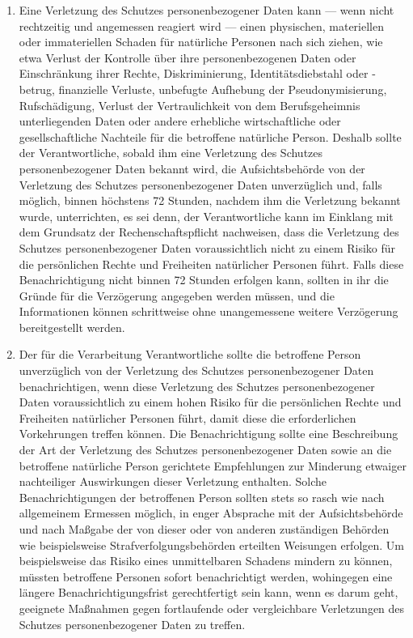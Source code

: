 \begin{enumerate}
   \item Eine Verletzung des Schutzes personenbezogener Daten kann — wenn nicht rechtzeitig und angemessen reagiert
    wird — einen physischen, materiellen oder immateriellen Schaden für natürliche Personen nach sich ziehen, wie etwa
    Verlust der Kontrolle über ihre personenbezogenen Daten oder Einschränkung ihrer Rechte, Diskriminierung,
    Identitätsdiebstahl oder -betrug, finanzielle Verluste, unbefugte Aufhebung der Pseudonymisierung, Rufschädigung,
    Verlust der Vertraulichkeit von dem Berufsgeheimnis unterliegenden Daten oder andere erhebliche wirtschaftliche
    oder gesellschaftliche Nachteile für die betroffene natürliche Person. Deshalb sollte der Verantwortliche, sobald
    ihm eine Verletzung des Schutzes personenbezogener Daten bekannt wird, die Aufsichtsbehörde von der Verletzung des
    Schutzes personenbezogener Daten unverzüglich und, falls möglich, binnen höchstens 72 Stunden, nachdem ihm die
    Verletzung bekannt wurde, unterrichten, es sei denn, der Verantwortliche kann im Einklang mit dem Grundsatz der
    Rechenschaftspflicht nachweisen, dass die Verletzung des Schutzes personenbezogener Daten voraussichtlich nicht zu
    einem Risiko für die persönlichen Rechte und Freiheiten natürlicher Personen führt. Falls diese Benachrichtigung
    nicht binnen 72 Stunden erfolgen kann, sollten in ihr die Gründe für die Verzögerung angegeben werden müssen, und
    die Informationen können schrittweise ohne unangemessene weitere Verzögerung bereitgestellt werden.%
   \label{eg:85}
   

   \item Der für die Verarbeitung Verantwortliche sollte die betroffene Person unverzüglich von der Verletzung des
    Schutzes personenbezogener Daten benachrichtigen, wenn diese Verletzung des Schutzes personenbezogener Daten
    voraussichtlich zu einem hohen Risiko für die persönlichen Rechte und Freiheiten natürlicher Personen führt, damit
    diese die erforderlichen Vorkehrungen treffen können. Die Benachrichtigung sollte eine Beschreibung der Art der
    Verletzung des Schutzes personenbezogener Daten sowie an die betroffene natürliche Person gerichtete Empfehlungen
    zur Minderung etwaiger nachteiliger Auswirkungen dieser Verletzung enthalten. Solche Benachrichtigungen der
    betroffenen Person sollten stets so rasch wie nach allgemeinem Ermessen möglich, in enger Absprache mit der
    Aufsichtsbehörde und nach Maßgabe der von dieser oder von anderen zuständigen Behörden wie beispielsweise
    Strafverfolgungsbehörden erteilten Weisungen erfolgen. Um beispielsweise das Risiko eines unmittelbaren Schadens
    mindern zu können, müssten betroffene Personen sofort benachrichtigt werden, wohingegen eine längere
    Benachrichtigungsfrist gerechtfertigt sein kann, wenn es darum geht, geeignete Maßnahmen gegen fortlaufende oder
    vergleichbare Verletzungen des Schutzes personenbezogener Daten zu treffen.%
   \label{eg:86}
   

\end{enumerate}
